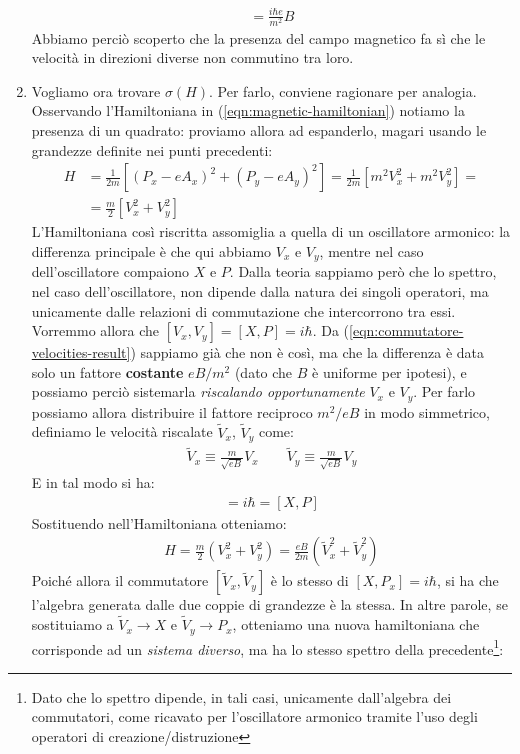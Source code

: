 \documentclass[../../FisicaTeorica.tex]{subfiles}
\begin{document}
\begin{enumerate}
\begin{align}
[V_x, V_y] = \frac{i\hbar e}{m^2}B
\label{eqn:commutatore-velocities-result}
\end{align}
Abbiamo perciò scoperto che la presenza del campo magnetico fa sì che le velocità in direzioni diverse non commutino tra loro.
\item Vogliamo ora trovare $\sigma(H)$. Per farlo, conviene ragionare per analogia. Osservando l'Hamiltoniana in (\ref{eqn:magnetic-hamiltonian}) notiamo la presenza di un quadrato: proviamo allora ad espanderlo, magari usando le grandezze definite nei punti precedenti:
\begin{align*}
H&=\frac{1}{2m}\left[(P_x - eA_x)^2 + (P_y - eA_y)^2\right]=\frac{1}{2m}\left[ m^2 V_x^2 + m^2 V_y^2\right] =\\
&= \frac{m}{2}\left[V_x^2 + V_y^2\right]
\end{align*}
L'Hamiltoniana così riscritta assomiglia a quella di un oscillatore armonico: la differenza principale è che qui abbiamo $V_x$ e $V_y$, mentre nel caso dell'oscillatore compaiono $X$ e $P$. Dalla teoria sappiamo però che lo spettro, nel caso dell'oscillatore, non dipende dalla natura dei singoli operatori, ma unicamente dalle relazioni di commutazione che intercorrono tra essi. Vorremmo allora che $[V_x, V_y] = [X, P]=i\hbar$. Da (\ref{eqn:commutatore-velocities-result}) sappiamo già che non è così, ma che la differenza è data solo un fattore \textbf{costante} $eB/m^2$ (dato che $B$ è uniforme per ipotesi), e possiamo perciò sistemarla \textit{riscalando opportunamente} $V_x$ e $V_y$. Per farlo possiamo allora distribuire il fattore reciproco $m^2/eB$ in modo simmetrico, definiamo le velocità riscalate $\tilde{V}_x$, $\tilde{V}_y$ come:
\begin{align*}
\tilde{V}_x \equiv \frac{m}{\sqrt{eB}}V_x \qquad \tilde{V}_y \equiv \frac{m}{\sqrt{eB}}V_y
\end{align*}
E in tal modo si ha:
\begin{align*}
[\tilde{V}_x, \tilde{V}_y] = i\hbar = [X,P]
\end{align*}
Sostituendo nell'Hamiltoniana otteniamo:\begin{align*}
H=\frac{m}{2}\left(V_x^2 + V_y^2\right) = \frac{eB}{2m}\left(\tilde{V}_x^2 + \tilde{V}_y^2\right)
\end{align*}
Poiché allora il commutatore $[\tilde{V}_x, \tilde{V}_y]$ è lo stesso di $[X,P_x] = i\hbar$, si ha che l'algebra generata dalle due coppie di grandezze è la stessa. In altre parole, se sostituiamo a $\tilde{V}_x \to X$ e $\tilde{V}_y \to P_{x}$, otteniamo una nuova hamiltoniana che corrisponde ad un \textit{sistema diverso}, ma ha lo stesso spettro della precedente\footnote{Dato che lo spettro dipende, in tali casi, unicamente dall'algebra dei commutatori, come ricavato per l'oscillatore armonico tramite l'uso degli operatori di creazione/distruzione}:

\end{enumerate}
\end{document}
